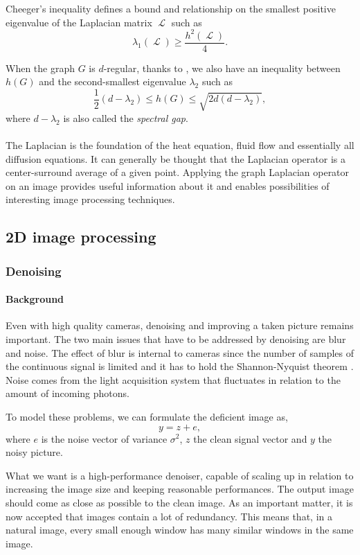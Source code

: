 \documentclass[]{article}
\DeclareMathOperator{\Lapl}{\mathcal{L}}
\begin{document}
Cheeger's inequality defines a bound and relationship on the smallest positive eigenvalue of the Laplacian matrix \(\Lapl \) such as
\[\lambda_1(\Lapl) \ge \frac{h^2(\Lapl)}{4}.\]

When the graph \(G\) is \(d\)-regular, thanks to \cite{cvetkovic_spectra_1980}, we also have an inequality between \(h(G)\) and the second-smallest eigenvalue \(\lambda_2\) such as
\[\frac{1}{2}(d-\lambda_2) \le h(G) \le \sqrt{2d(d-\lambda_2)},\]
where \(d - \lambda_2\) is also called the \textit{spectral gap}.

\paragraph{}
The Laplacian is the foundation of the heat equation, fluid flow and essentially all diffusion equations.
It can generally be thought that the Laplacian operator is a center-surround average \cite{siam_slides_2016} of a given point.
Applying the graph Laplacian operator on an image provides useful information about it and enables possibilities of interesting image processing techniques.

\subsection{2D image processing}

\subsubsection{Denoising}

\paragraph{Background}
Even with high quality cameras, denoising and improving a taken picture remains important.
The two main issues that have to be addressed by denoising are blur and noise.
The effect of blur is internal to cameras since the number of samples of the continuous signal is limited and it has to hold the Shannon-Nyquist theorem \cite{buades_review_2005}.
Noise comes from the light acquisition system that fluctuates in relation to the amount of incoming photons.

To model these problems, we can formulate the deficient image as,
\[y = z + e,\]
where \(e\) is the noise vector of variance \(\sigma^2\), \(z\) the clean signal vector and \(y\) the noisy picture.

What we want is a high-performance denoiser, capable of scaling up in relation to increasing the image size and keeping reasonable performances.
The output image should come as close as possible to the clean image.
As an important matter, it is now accepted that images contain a lot of redundancy.
This means that, in a natural image, every small enough window has many similar windows in the same image.
\end{document}
